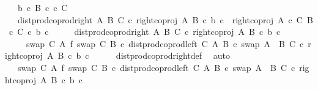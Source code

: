 \begin{isabellebody}
\ \ \ {\isachardoublequoteopen}b\ {\isasymin}\isactrlsub c\ B{\isachardoublequoteclose}\ {\isachardoublequoteopen}c\ {\isasymin}\isactrlsub c\ C{\isachardoublequoteclose}\isanewline
\ \ \ {\isachardoublequoteopen}dist{\isacharunderscore}{\kern0pt}prod{\isacharunderscore}{\kern0pt}coprod{\isacharunderscore}{\kern0pt}right\ A\ B\ C\ {\isasymcirc}\isactrlsub c\ {\isasymlangle}right{\isacharunderscore}{\kern0pt}coproj\ A\ B\ {\isasymcirc}\isactrlsub c\ b{\isacharcomma}{\kern0pt}\ c{\isasymrangle}\ {\isacharequal}{\kern0pt}\ right{\isacharunderscore}{\kern0pt}coproj\ {\isacharparenleft}{\kern0pt}A\ {\isasymtimes}\isactrlsub c\ C{\isacharparenright}{\kern0pt}\ {\isacharparenleft}{\kern0pt}B\ {\isasymtimes}\isactrlsub c\ C{\isacharparenright}{\kern0pt}\ {\isasymcirc}\isactrlsub c\ {\isasymlangle}b{\isacharcomma}{\kern0pt}\ c{\isasymrangle}{\isachardoublequoteclose}\isanewline
%
\isadelimproof
%
\endisadelimproof
%
\isatagproof
{}\isamarkupfalse%
\ {\isacharminus}{\kern0pt}\isanewline
\ \ \isamarkupfalse%
\ {\isachardoublequoteopen}dist{\isacharunderscore}{\kern0pt}prod{\isacharunderscore}{\kern0pt}coprod{\isacharunderscore}{\kern0pt}right\ A\ B\ C\ {\isasymcirc}\isactrlsub c\ {\isasymlangle}right{\isacharunderscore}{\kern0pt}coproj\ A\ B\ {\isasymcirc}\isactrlsub c\ b{\isacharcomma}{\kern0pt}\ c{\isasymrangle}\isanewline
\ \ \ \ {\isacharequal}{\kern0pt}\ {\isacharparenleft}{\kern0pt}{\isacharparenleft}{\kern0pt}swap\ C\ A\ {\isasymbowtie}\isactrlsub f\ swap\ C\ B{\isacharparenright}{\kern0pt}\ {\isasymcirc}\isactrlsub c\ dist{\isacharunderscore}{\kern0pt}prod{\isacharunderscore}{\kern0pt}coprod{\isacharunderscore}{\kern0pt}left\ C\ A\ B\ {\isasymcirc}\isactrlsub c\ swap\ {\isacharparenleft}{\kern0pt}A\ {\isasymCoprod}\ B{\isacharparenright}{\kern0pt}\ C{\isacharparenright}{\kern0pt}\ {\isasymcirc}\isactrlsub c\ {\isasymlangle}right{\isacharunderscore}{\kern0pt}coproj\ A\ B\ {\isasymcirc}\isactrlsub c\ b{\isacharcomma}{\kern0pt}\ c{\isasymrangle}{\isachardoublequoteclose}\isanewline
\ \ \ \ \isamarkupfalse%
\ dist{\isacharunderscore}{\kern0pt}prod{\isacharunderscore}{\kern0pt}coprod{\isacharunderscore}{\kern0pt}right{\isacharunderscore}{\kern0pt}def\ \isamarkupfalse%
\ auto\isanewline
\ \ \isamarkupfalse%
\ \isamarkupfalse%
\ {\isachardoublequoteopen}{\isachardot}{\kern0pt}{\isachardot}{\kern0pt}{\isachardot}{\kern0pt}\ {\isacharequal}{\kern0pt}\ {\isacharparenleft}{\kern0pt}swap\ C\ A\ {\isasymbowtie}\isactrlsub f\ swap\ C\ B{\isacharparenright}{\kern0pt}\ {\isasymcirc}\isactrlsub c\ dist{\isacharunderscore}{\kern0pt}prod{\isacharunderscore}{\kern0pt}coprod{\isacharunderscore}{\kern0pt}left\ C\ A\ B\ {\isasymcirc}\isactrlsub c\ swap\ {\isacharparenleft}{\kern0pt}A\ {\isasymCoprod}\ B{\isacharparenright}{\kern0pt}\ C\ {\isasymcirc}\isactrlsub c\ {\isasymlangle}right{\isacharunderscore}{\kern0pt}coproj\ A\ B\ {\isasymcirc}\isactrlsub c\ b{\isacharcomma}{\kern0pt}\ c{\isasymrangle}{\isachardoublequoteclose}\isanewline

\end{isabellebody}

